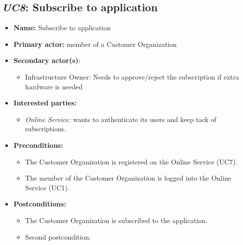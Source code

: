 \documentclass[english,peerreview]{sareport}
\begin{document}
\subsection{\emph{UC8}: Subscribe to application}
\begin{itemize}
    \item \textbf{Name:} Subscribe to application
    \item \textbf{Primary actor:} member of a Customer Organization
    \item \textbf{Secondary actor(s)}: 
	\begin{itemize}
		\item Infrastructure Owner: Needs to approve/reject the subscription if extra hardware is needed
	\end{itemize}
    \item \textbf{Interested parties:} 
        \begin{itemize}
            \item \textit{Online Service:} wants to authenticate its users and keep tack of subscriptions.
        \end{itemize}

    \item \textbf{Preconditions:}
        \begin{itemize}
            \item The Customer Organization is registered on the Online Service (UC7).
            \item The member of the Customer Organization is logged into the Online Service (UC1).
        \end{itemize}

    \item \textbf{Postconditions:}
        \begin{itemize}
            \item The Customer Organization is subscribed to the application.
            \item Second postcondition.
        \end{itemize}
        

\end{itemize}
\end{document}
